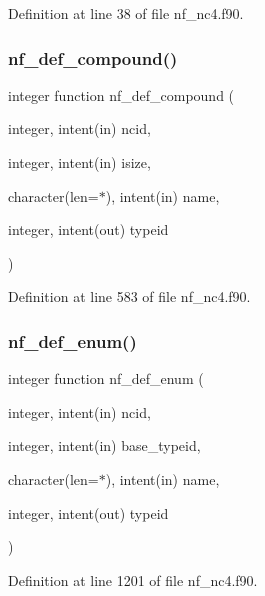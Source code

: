 Definition at line 38 of file nf\+\_\+nc4.\+f90.

\mbox{\label{nf__nc4_8f90_a5de0e7952f0f6b47facccd913f55a2aa}} 
\subsubsection{\texorpdfstring{nf\+\_\+def\+\_\+compound()}{nf\_def\_compound()}}
{\footnotesize\ttfamily integer function nf\+\_\+def\+\_\+compound (\begin{DoxyParamCaption}\item[{integer, intent(in)}]{ncid,  }\item[{integer, intent(in)}]{isize,  }\item[{character(len=$\ast$), intent(in)}]{name,  }\item[{integer, intent(out)}]{typeid }\end{DoxyParamCaption})}



Definition at line 583 of file nf\+\_\+nc4.\+f90.

\mbox{\label{nf__nc4_8f90_a9d6c5d97364962500ad4a646364d6bc8}} 
\subsubsection{\texorpdfstring{nf\+\_\+def\+\_\+enum()}{nf\_def\_enum()}}
{\footnotesize\ttfamily integer function nf\+\_\+def\+\_\+enum (\begin{DoxyParamCaption}\item[{integer, intent(in)}]{ncid,  }\item[{integer, intent(in)}]{base\+\_\+typeid,  }\item[{character(len=$\ast$), intent(in)}]{name,  }\item[{integer, intent(out)}]{typeid }\end{DoxyParamCaption})}



Definition at line 1201 of file nf\+\_\+nc4.\+f90.

\mbox{\label{nf__nc4_8f90_ae54287df3c57aef973a360dbf495924c}} 
